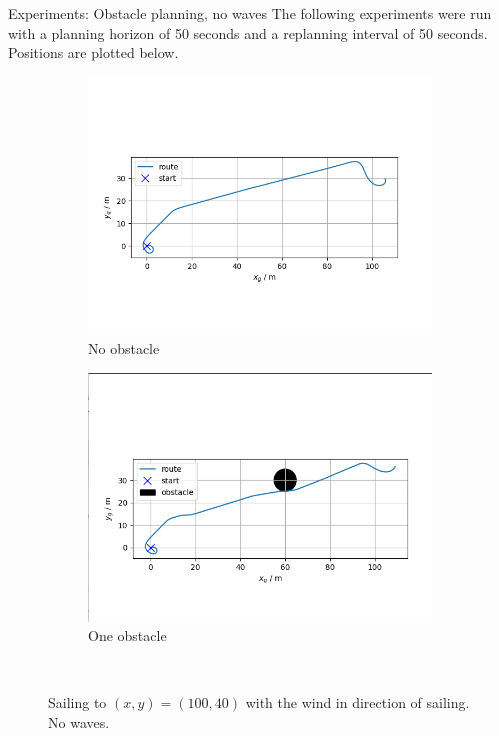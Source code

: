 \documentclass[10pt,xcolor={table,dvipsnames},t]{beamer}
\begin{document}
\begin{frame}{Experiments: Obstacle planning, no waves}
    The following experiments were run with a planning horizon of 50 seconds and a replanning interval of 50 seconds. Positions are plotted below. 
    
    
    \begin{figure}
     \centering
      \begin{subfigure}[b]{0.49\textwidth}
         \centering
         \includegraphics[width=\textwidth,trim={0.5cm 2cm 1.5cm 2.5cm },clip]{Figures/no-obstacle-no-waves-wind-5-10/position.png}
         \caption{No obstacle}
         \label{fig:no_obstacle_no_waves}
     \end{subfigure}
     \begin{subfigure}[b]{0.49\textwidth}
         \centering
         \includegraphics[width=\textwidth,trim={0.5cm 1cm 0.75cm 2.5cm },clip]{Figures/Obstacles-waves-wind-4-45/obsta.png}
         \caption{One obstacle}
         \label{fig:obstacle_no_waves}
     \end{subfigure}
    
     \hfill\\
     
    \caption{Sailing to \((x,y)=(100,40)\) with the wind in direction of sailing. No waves.}
    \label{fig:sail_with_wind}
\end{figure}
    
\end{frame}
\end{document}
